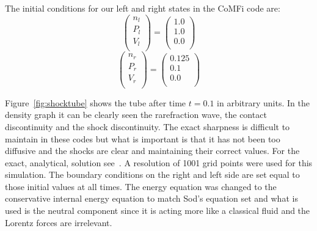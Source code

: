 \documentclass[12pt,upcase]{umlthesis}
\begin{document}
The initial conditions for our left and right states in the CoMFi code are:
\begin{equation}\label{eq:shockinitialconditionsl}
	\begin{pmatrix}
		n_l \\
		P_l \\
		V_l \\
	\end{pmatrix}
	=
	\begin{pmatrix}
		1.0 \\
		1.0 \\
		0.0 \\
	\end{pmatrix}
\end{equation}
\begin{equation}\label{eq:shockinitialconditionsr}
	\begin{pmatrix}
		n_r \\
		P_r \\
		V_r \\
	\end{pmatrix}
	=
	\begin{pmatrix}
		0.125 \\
		0.1 \\
		0.0 \\
	\end{pmatrix}
\end{equation}
	
Figure~\ref{fig:shocktube} shows the tube after time $t = 0.1$ in arbitrary units. In the density graph it can be clearly seen the rarefraction wave, the contact discontinuity and the shock discontinuity. The exact sharpness is difficult to maintain in these codes but what is important is that it has not been too diffusive and the shocks are clear and maintaining their correct values. For the exact, analytical, solution see~\citet{Sod1978}. A resolution of 1001 grid points were used for this simulation. The boundary conditions on the right and left side are set equal to those initial values at all times. The energy equation was changed to the conservative internal energy equation to match Sod's equation set and what is used is the neutral component since it is acting more like a classical fluid and the Lorentz forces are irrelevant.
\end{document}
